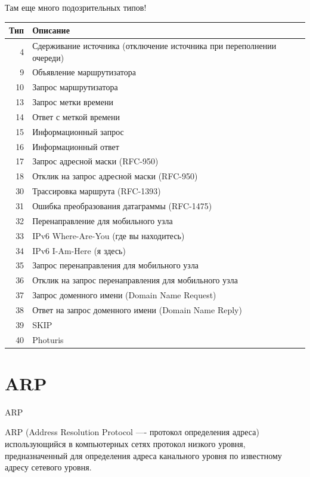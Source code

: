 \begin{frame}{Там еще много подозрительных типов!}
	\scriptsize
	\begin{table}[ht]
	\centering
	\begin{tabular}[c]{r|l}
Тип & Описание \\
	\hline
4 & Сдерживание источника (отключение источника при переполнении очереди)\\
9 & Объявление маршрутизатора\\
10 & Запрос маршрутизатора\\
13 & Запрос метки времени\\
14 & Ответ с меткой времени\\
15 & Информационный запрос\\
16 & Информационный ответ\\
17 & Запрос адресной маски (RFC-950)\\
18 & Отклик на запрос адресной маски (RFC-950)\\
30 & Трассировка маршрута (RFC-1393)\\
31 & Ошибка преобразования датаграммы (RFC-1475)\\
32 & Перенаправление для мобильного узла\\
33 & IPv6 Where-Are-You (где вы находитесь)\\
34 & IPv6 I-Am-Here (я здесь)\\
35 & Запрос перенаправления для мобильного узла\\
36 & Отклик на запрос перенаправления для мобильного узла\\
37 & Запрос доменного имени (Domain Name Request)\\
38 & Ответ на запрос доменного имени (Domain Name Reply)\\
39 & SKIP\\
40 & Photuris\\
	\end{tabular}
	\end{table}
	\normalsize
\end{frame}

\section{ARP}

\begin{frame}{ARP}
	\begin{block}{ARP (Address Resolution Protocol —- протокол определения адреса)}
		использующийся в компьютерных сетях протокол низкого уровня,  предназначенный для определения адреса канального уровня по известному адресу сетевого уровня.
	\end{block}
\end{frame}


